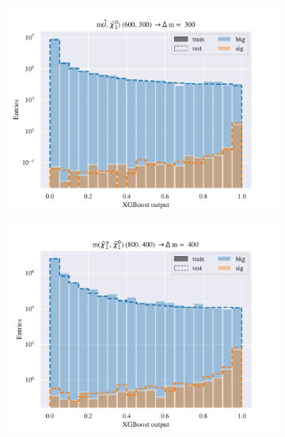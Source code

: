 \begin{figure}[H]
    \centering
    \begin{subfigure}[t!]{0.49\textwidth}
        \includegraphics[width = \textwidth]{Figures/SlepSlep/ML/BDT/High_level/Inter/scaled_train_test_396014.pdf}
        \caption{}
        \label{fig:traintestscaled}
    \end{subfigure}
    \begin{subfigure}[t!]{0.49\textwidth}
        \includegraphics[width = \textwidth]{Figures/SlepSnu/BDT/Low_level/Inter/scaled_train_test_397150.pdf}
        \caption{}
        \label{fig:ROCBDTLow_low_level}
    \end{subfigure}
    \begin{subfigure}[t!]{0.49\textwidth}

\end{subfigure}
\end{figure}
